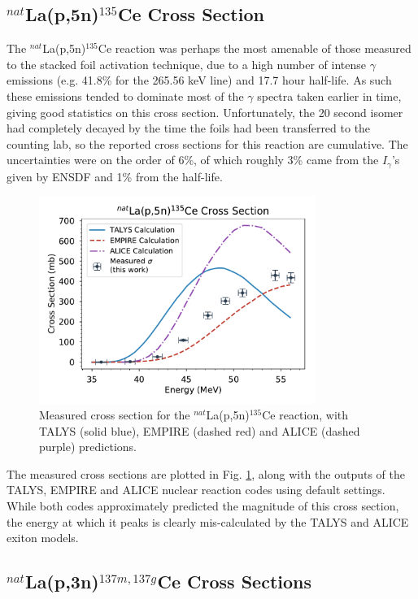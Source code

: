 \documentclass[aps,superscriptaddress,twocolumn,secnumarabic,balancelastpage,amsmath,amssymb,nofootinbib,floatfix]{revtex4-1}
\begin{document}
\subsection{$^{nat}$La(p,5n)$^{135}$Ce Cross Section}

The $^{nat}$La(p,5n)$^{135}$Ce reaction was perhaps the most amenable of those measured to the stacked foil activation technique, due to a high number of intense $\gamma$ emissions (e.g. 41.8\% for the 265.56 keV line) and 17.7 hour half-life.  As such these emissions tended to dominate most of the $\gamma$ spectra taken earlier in time, giving good statistics on this cross section.  Unfortunately, the 20 second isomer had completely decayed by the time the foils had been transferred to the counting lab, so the reported cross sections for this reaction are cumulative.  The uncertainties were on the order of 6\%, of which roughly 3\% came from the $I_{\gamma}$'s given by ENSDF \cite{ensdf} and 1\% from the half-life.  

\begin{figure}[htb]
\includegraphics[width=9cm]{cross_sections/135CE}
\caption{Measured cross section for the $^{nat}$La(p,5n)$^{135}$Ce reaction, with TALYS (solid blue), EMPIRE (dashed red) and ALICE (dashed purple) predictions.
}
\label{fig:135CE}
\end{figure}

The measured cross sections are plotted in Fig. \ref{fig:135CE}, along with the outputs of the TALYS, EMPIRE and ALICE nuclear reaction codes using default settings.  While both codes approximately predicted the magnitude of this cross section, the energy at which it peaks is clearly mis-calculated by the TALYS and ALICE exiton models.

\subsection{$^{nat}$La(p,3n)$^{137m,137g}$Ce Cross Sections}
\end{document}
